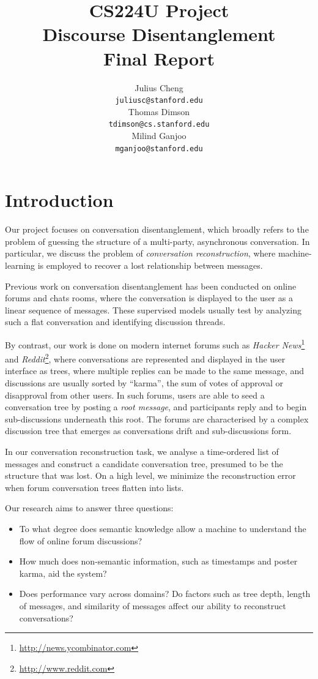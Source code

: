 \documentclass{article}
\title{{\small CS224U Project} \\ Discourse Disentanglement \\ \small{Final Report}}
\author{Julius Cheng \\
  {\tt juliusc@stanford.edu}
  \\\And
  Thomas Dimson  \\
  {\tt tdimson@cs.stanford.edu}
  \\\AND
  Milind Ganjoo \\
  {\tt mganjoo@stanford.edu}
}
\date{}
\begin{document}
\maketitle

\section{Introduction}
Our project focuses on conversation disentanglement, which broadly refers to
the problem of guessing the structure of a multi-party, asynchronous
conversation. In particular, we discuss the problem of \textit{conversation
reconstruction}, where machine-learning is employed to recover a lost
relationship between messages.

Previous work on conversation disentanglement has been conducted on online
forums and chats rooms, where the conversation is displayed to the user as a
linear sequence of messages. These supervised models usually test by analyzing
such a flat conversation and identifying discussion threads.

By contrast, our work is done on modern internet forums such as
\textit{Hacker News}\footnote{\url{http://news.ycombinator.com}} 
and \textit{Reddit}\footnote{\url{http://www.reddit.com}}, where conversations
are represented and displayed in the user interface as trees, where multiple
replies can be made to the same message, and discussions are usually sorted by
``karma'', the sum of votes of approval or disapproval from other users. In such forums, users are able to seed a conversation tree by posting a 
\textit{root message}, and participants reply and to begin sub-discussions 
underneath this root. The forums are characterised by a complex 
discussion tree that emerges as conversations drift and sub-discussions form.

In our conversation reconstruction task, we analyse a time-ordered list
of messages and construct a candidate conversation tree, presumed to be the structure
that was lost. On a high level, we minimize the reconstruction
error when forum conversation trees flatten into lists.

Our research aims to answer three questions:
\begin{itemize}
  \item To what degree does semantic knowledge allow a machine to understand the 
    flow of online forum discussions?
  \item How much does non-semantic information, such as timestamps and poster karma,
    aid the system?
  \item Does performance vary across domains? Do factors such as tree depth,
    length of messages, and similarity of messages affect our ability to
    reconstruct conversations? 
\end{itemize}
\end{document}
